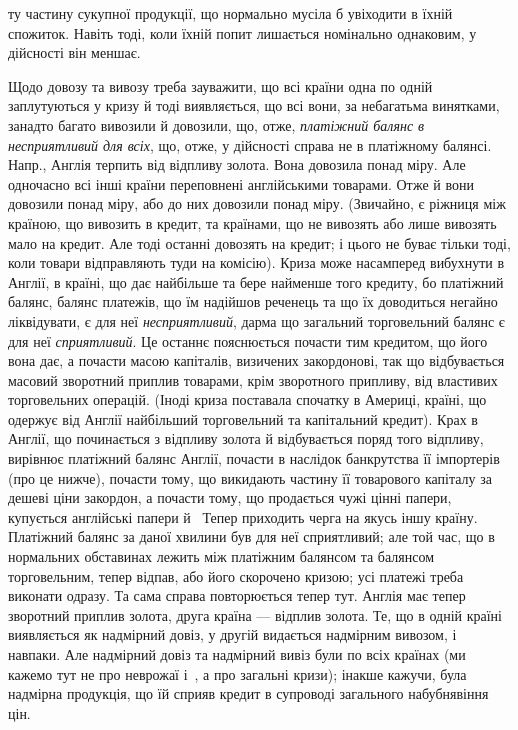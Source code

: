 \parcont{}  %
ту частину сукупної продукції, що нормально мусіла б увіходити в їхній спожиток.
Навіть тоді, коли їхній попит лишається номінально однаковим, у дійсності він
меншає.

Щодо довозу та вивозу треба зауважити, що всі країни одна по одній
заплутуються у кризу й тоді виявляється, що всі вони, за небагатьма винятками,
занадто багато вивозили й довозили, що, отже, \emph{платіжний балянс в несприятливий
для всіх}, що, отже, у дійсності справа не в платіжному балянсі.
Напр., Англія терпить від відпливу золота. Вона довозила понад міру. Але одночасно
всі інші країни переповнені англійськими товарами. Отже й вони довозили
понад міру, або до них довозили понад міру. (Звичайно, є ріжниця між країною,
що вивозить в кредит, та країнами, що не вивозять або лише вивозять мало
на кредит. Але тоді останні довозять на кредит; і цього не буває тільки тоді,
коли товари відправляють туди на комісію). Криза може насамперед вибухнути
в Англії, в країні, що дає найбільше та бере найменше того кредиту, бо платіжний
балянс, балянс платежів, що їм надійшов реченець та що їх доводиться
негайно ліквідувати, є для неї \emph{несприятливий}, дарма що загальний торговельний
балянс є для неї \emph{сприятливий}. Це останнє пояснюється почасти тим
кредитом, що його вона дає, а почасти масою капіталів, визичених закордонові,
так що відбувається масовий зворотний приплив товарами, крім зворотного припливу,
від властивих торговельних операцій. (Іноді криза поставала спочатку в
Америці, країні, що одержує від Англії найбільший торговельний та капітальний
кредит). Крах в Англії, що починається з відпливу золота й відбувається поряд того
відпливу, вирівнює платіжний балянс Англії, почасти в наслідок банкрутства її
імпортерів (про це нижче), почасти тому, що викидають частину її товарового капіталу
за дешеві ціни закордон, а почасти тому, що продається чужі цінні папери,
купується англійські папери й~ Тепер приходить черга на якусь іншу
країну. Платіжний балянс за даної хвилини був для неї сприятливий; але той
час, що в нормальних обставинах лежить між платіжним балянсом та балянсом
торговельним, тепер відпав, або його скорочено кризою; усі платежі треба виконати
одразу. Та сама справа повторюється тепер тут. Англія має тепер зворотний
приплив золота, друга країна — відплив золота. Те, що в одній країні виявляється
як надмірний довіз, у другій видається надмірним вивозом, і навпаки. Але надмірний
довіз та надмірний вивіз були по всіх країнах (ми кажемо тут не про
неврожаї і~, а про загальні кризи); інакше кажучи, була надмірна продукція,
що їй сприяв кредит в супроводі загального набубнявіння цін.

